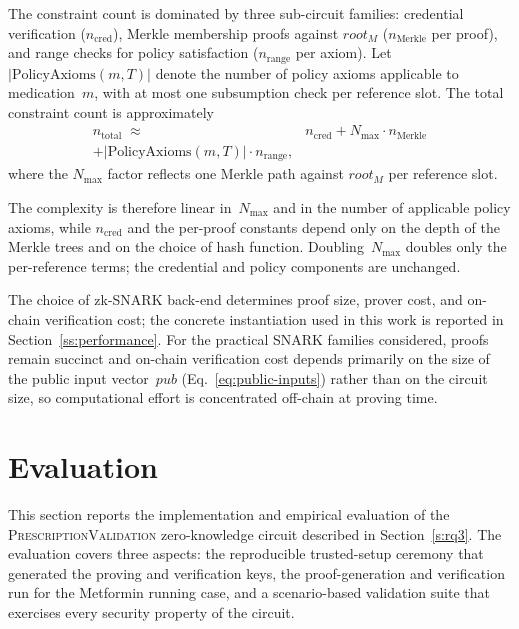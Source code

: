 \documentclass[journal]{IEEEtran}
\begin{document}
The constraint count is dominated by three sub-circuit
families: credential verification ($n_{\mathrm{cred}}$),
Merkle membership proofs against $\mathit{root}_M$ ($n_{\mathrm{Merkle}}$ per
proof), and range checks for policy
satisfaction ($n_{\mathrm{range}}$ per axiom).
Let $|\mathrm{PolicyAxioms}(m,T)|$ denote the number of
policy axioms applicable to medication~$m$, with at most one
subsumption check per reference slot.
The total constraint count is approximately
\begin{equation}
\begin{split}
n_{\mathrm{total}} \;\approx\;\;
&n_{\mathrm{cred}}
+ N_{\max} \cdot n_{\mathrm{Merkle}} \\
+ |\mathrm{PolicyAxioms}(m,T)| \cdot n_{\mathrm{range}},
\end{split}
\label{eq:complexity}
\end{equation}
where the $N_{\max}$ factor reflects one Merkle path against
$\mathit{root}_M$ per reference slot.

The complexity is therefore linear in~$N_{\max}$ and in the
number of applicable policy axioms, while $n_{\mathrm{cred}}$
and the per-proof constants depend only on the depth of the
Merkle trees and on the choice of hash function.
Doubling~$N_{\max}$ doubles only the per-reference terms;
the credential and policy components are unchanged.

The choice of zk-SNARK back-end determines proof size, prover
cost, and on-chain verification cost; the concrete
instantiation used in this work is reported in
Section~\ref{ss:performance}.
For the practical SNARK families considered, proofs remain
succinct and on-chain verification cost depends primarily on
the size of the public input vector~$\mathit{pub}$
(Eq.~\ref{eq:public-inputs}) rather than on the circuit size,
so computational effort is concentrated off-chain at proving
time.


\section{Evaluation}
\label{s:eval}

This section reports the implementation and empirical evaluation of the
\textsc{PrescriptionValidation} zero-knowledge circuit described in
Section~\ref{s:rq3}.
The evaluation covers three aspects: the reproducible trusted-setup ceremony that
generated the proving and verification keys, the proof-generation and verification
run for the Metformin running case, and a scenario-based validation suite that
exercises every security property of the circuit.
\end{document}
